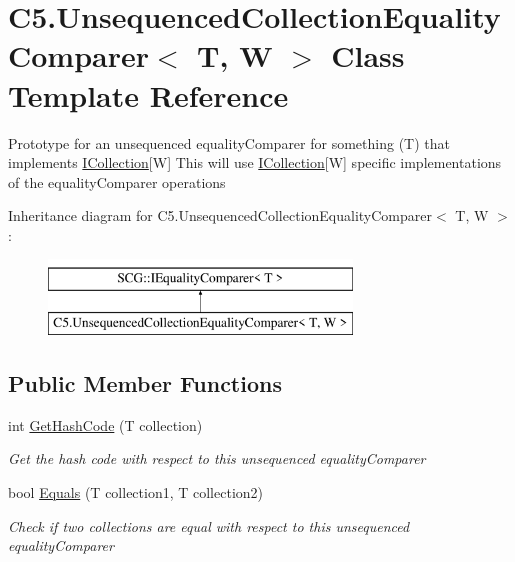 \hypertarget{class_c5_1_1_unsequenced_collection_equality_comparer}{}\section{C5.\+Unsequenced\+Collection\+Equality\+Comparer$<$ T, W $>$ Class Template Reference}
\label{class_c5_1_1_unsequenced_collection_equality_comparer}


Prototype for an unsequenced equality\+Comparer for something (T) that implements \hyperlink{interface_c5_1_1_i_collection}{I\+Collection}\mbox{[}W\mbox{]} This will use \hyperlink{interface_c5_1_1_i_collection}{I\+Collection}\mbox{[}W\mbox{]} specific implementations of the equality\+Comparer operations  


Inheritance diagram for C5.\+Unsequenced\+Collection\+Equality\+Comparer$<$ T, W $>$\+:\begin{figure}[H]
\begin{center}
\leavevmode
\includegraphics[height=2.000000cm]{class_c5_1_1_unsequenced_collection_equality_comparer}
\end{center}
\end{figure}
\subsection*{Public Member Functions}
\begin{DoxyCompactItemize}
\item 
int \hyperlink{class_c5_1_1_unsequenced_collection_equality_comparer_a2bee3b4afbdb5f1b89c4b6cee97a6549}{Get\+Hash\+Code} (T collection)
\begin{DoxyCompactList}\small\item\em Get the hash code with respect to this unsequenced equality\+Comparer \end{DoxyCompactList}\item 
bool \hyperlink{class_c5_1_1_unsequenced_collection_equality_comparer_a677c4a4168edae64808c81368d16eb92}{Equals} (T collection1, T collection2)
\begin{DoxyCompactList}\small\item\em Check if two collections are equal with respect to this unsequenced equality\+Comparer \end{DoxyCompactList}\end{DoxyCompactItemize}
